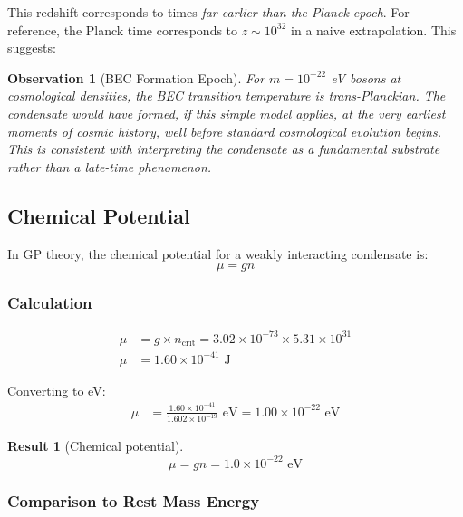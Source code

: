 \documentclass[11pt,a4paper]{article}
\newcommand{\ee}[1]{\times 10^{#1}}
\newtheorem{result}{Result}
\newtheorem{observation}{Observation}
\begin{document}
This redshift corresponds to times \emph{far earlier than the Planck epoch}. For reference, the Planck time corresponds to $z \sim 10^{32}$ in a naive extrapolation. This suggests:

\begin{observation}[BEC Formation Epoch]
For $m = 10^{-22}$ eV bosons at cosmological densities, the BEC transition temperature is trans-Planckian. The condensate would have formed, if this simple model applies, at the very earliest moments of cosmic history, well before standard cosmological evolution begins. This is consistent with interpreting the condensate as a fundamental substrate rather than a late-time phenomenon.
\end{observation}

\subsection{Chemical Potential}
\label{sec:chemical_potential}

In GP theory, the chemical potential for a weakly interacting condensate is:
\begin{equation}
\mu = gn
\end{equation}

\subsubsection{Calculation}

\begin{align}
\mu &= g \times n_{\mathrm{crit}} = 3.02 \ee{-73} \times 5.31 \ee{31} \nonumber \\
\mu &= 1.60 \ee{-41} \text{ J}
\end{align}

Converting to eV:
\begin{align}
\mu &= \frac{1.60 \ee{-41}}{1.602 \ee{-19}} \text{ eV} = 1.00 \ee{-22} \text{ eV}
\end{align}

\begin{result}[Chemical potential]
\begin{equation}
\boxed{\mu = gn = 1.0 \times 10^{-22} \text{ eV}}
\end{equation}
\end{result}

\subsubsection{Comparison to Rest Mass Energy}
\end{document}
